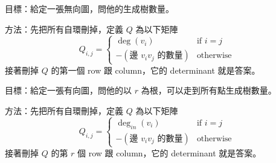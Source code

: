 目標：給定一張無向圖，問他的生成樹數量。

\noindent
方法：先把所有自環刪掉，定義 $Q$ 為以下矩陣
$$
Q_{i,j} =
\begin{cases}
\deg(v_{i}) &  \text{if } i=j \\
-(\text{邊 } v_{i}v_{j} \text{ 的數量}) & \text{otherwise}
\end{cases}
$$
接著刪掉 $Q$ 的第一個 row 跟 column，它的 determinant 就是答案。

\noindent
目標：給定一張有向圖，問他的以 $r$ 為根，可以走到所有點生成樹數量。

\vspace{1em}
\hline
\vspace{1em}

\noindent
方法：先把所有自環刪掉，定義 $Q$ 為以下矩陣
$$
Q_{i,j} =
\begin{cases}
\deg_{in}(v_{i}) &  \text{if } i=j \\
-(\text{邊 } v_{i}v_{j} \text{ 的數量}) & \text{otherwise}
\end{cases}
$$
\noindent
接著刪掉 $Q$ 的第 $r$ 個 row 跟 column，它的 determinant 就是答案。